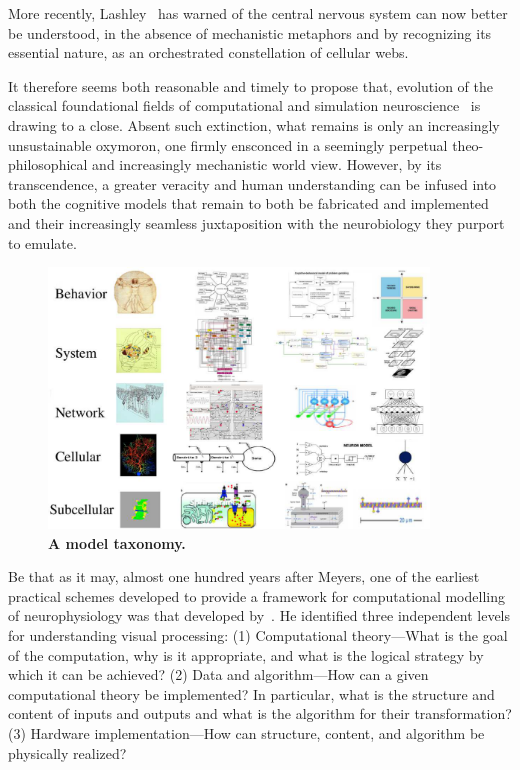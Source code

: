 \documentclass[11pt,3p,twocolumn]{JMN}
\begin{document}
More recently, Lashley~\citep[see][]{jorgensen21} has warned of
the central nervous system can now better be understood, in the absence of mechanistic metaphors and by recognizing its essential nature, as an orchestrated constellation of cellular webs. 

It therefore seems both reasonable and timely to propose that, evolution of the classical foundational fields of computational and simulation neuroscience~\citep[see][]{fan19} is drawing to a close. Absent such extinction, what remains is only an increasingly unsustainable oxymoron, one firmly ensconced in a seemingly perpetual theo-philosophical and increasingly mechanistic world view. However, by its transcendence, a greater veracity and human understanding can be infused into both the cognitive models that remain to both be fabricated and implemented and their increasingly seamless juxtaposition with the neurobiology they purport to emulate. 

\begin{figure}[h!t]
  \begin{center}
    \includegraphics[width=0.9\textwidth]{figures/multi-scale-taxonomy-no-arrows-no-texts.pdf}
    \caption{ \small{\bf A model taxonomy.} }
  \end{center}
  \label{fig:multi-scale-taxonomy}
\end{figure}

Be that as it may, almost one hundred years after Meyers, one of the earliest practical schemes developed to provide a framework for computational modelling of neurophysiology was that developed by~\citet{Marr:1982fk}. He identified three independent levels for understanding visual processing: (1) Computational theory---What is the goal of the computation, why is it appropriate, and what is the logical strategy by which it can be achieved? (2) Data and algorithm---How can a given computational theory be implemented? In particular, what is the structure and content of inputs and outputs and what is the algorithm for their transformation? (3) Hardware implementation---How can structure, content, and algorithm be physically realized?
\end{document}
